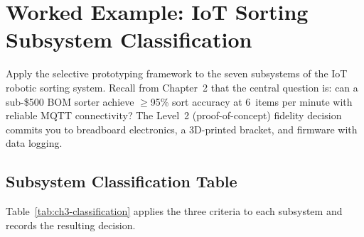 \section*{Worked Example: IoT Sorting Subsystem Classification}
\label{sec:ch3-worked-example}

Apply the selective prototyping framework to the seven subsystems of the IoT
robotic sorting system.
Recall from Chapter~2 that the central question is: can a sub-\$500 BOM sorter
achieve $\geq$95\% sort accuracy at 6~items per minute with reliable MQTT
connectivity?
The Level~2 (proof-of-concept) fidelity decision commits you to breadboard
electronics, a 3D-printed bracket, and firmware with data logging.

\subsection{Subsystem Classification Table}

Table~\ref{tab:ch3-classification} applies the three criteria to each
subsystem and records the resulting decision.

